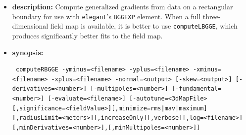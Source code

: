 \documentclass[11pt]{article}
\begin{document}
\begin{itemize}
\item {\bf description:}  Compute generalized gradients \cite{Venturini-NIMA427-387} from data on a rectangular
  boundary \cite{Mitchell-2007} for use with {\tt elegant}'s \verb|BGGEXP| element. When a full three-dimensional
  field map is available, it is better to use \verb|computeLBGGE|, which produces significantly better fits to the field map.

\item {\bf synopsis:}
\begin{flushleft}{\tt
computeRBGGE -yminus=<filename> -yplus=<filename> -xminus=<filename> -xplus=<filename>
   -normal=<output> [-skew=<output>] [-derivatives=<number>] [-multipoles=<number>] 
   [-fundamental=<number>] [-evaluate=<filename>]
   [-autotune=<3dMapFile>[,significance=<fieldValue>][,minimize={rms|mav|maximum}]
               [,radiusLimit=<meters>][,increaseOnly][,verbose][,log=<filename>]
               [,minDerivatives=<number>],[,minMultipoles=<number>]]
}\end{flushleft}


\end{itemize}
\end{document}
